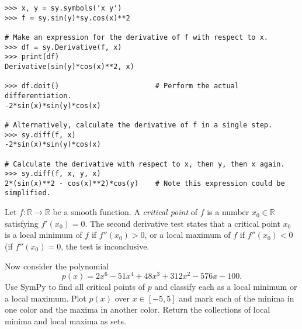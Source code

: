 \begin{lstlisting}
>>> x, y = sy.symbols('x y')
>>> f = sy.sin(y)*sy.cos(x)**2

# Make an expression for the derivative of f with respect to x.
>>> df = sy.Derivative(f, x)
>>> print(df)
Derivative(sin(y)*cos(x)**2, x)

>>> df.doit()                       # Perform the actual differentiation.
-2*sin(x)*sin(y)*cos(x)

# Alternatively, calculate the derivative of f in a single step.
>>> sy.diff(f, x)
-2*sin(x)*sin(y)*cos(x)

# Calculate the derivative with respect to x, then y, then x again.
>>> sy.diff(f, x, y, x)
2*(sin(x)**2 - cos(x)**2)*cos(y)    # Note this expression could be simplified.
\end{lstlisting}

\begin{problem} %
Let $f:\mathbb{R}\rightarrow\mathbb{R}$ be a smooth function.
A \emph{critical point} of $f$ is a number $x_0\in\mathbb{R}$ satisfying $f'(x_0) = 0$.
The second derivative test states that a critical point $x_0$ is a local minimum of $f$ if $f''(x_0) > 0$, or a local maximum of $f$ if $f''(x_0) < 0$ (if $f''(x_0) = 0$, the test is inconclusive.

Now consider the polynomial
\[
p(x) = 2x^6 - 51x^4 + 48x^3 + 312x^2 - 576x - 100.
\]
Use SymPy to find all critical points of $p$ and classify each as a local minimum or a local maximum.
Plot $p(x)$ over $x\in[-5,5]$ and mark each of the minima in one color and the maxima in another color.
Return the collections of local minima and local maxima as sets.
\end{problem}

